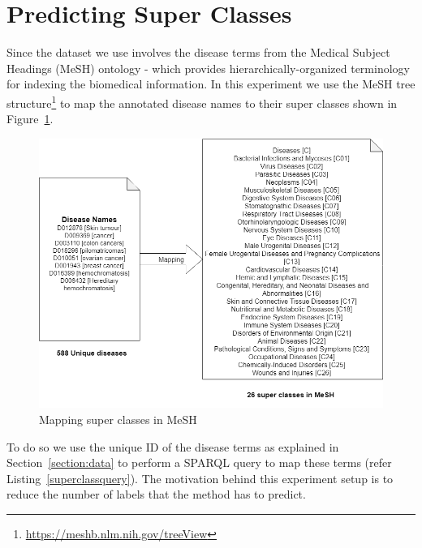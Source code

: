 \section{Predicting Super Classes}
Since the dataset we use involves the disease terms from the Medical Subject Headings (MeSH) ontology - which provides hierarchically-organized terminology for indexing the biomedical information. 
In this experiment we use the MeSH tree structure\footnote{\url{https://meshb.nlm.nih.gov/treeView}} to map the annotated disease names to their super classes shown in Figure~\ref{fig:meshsuperclass}. 
\begin{figure}[!htb]
    \centering
    \includegraphics[scale=0.45]{Figures/NN_prediction.png}
    \caption{Mapping super classes in MeSH}
    \label{fig:meshsuperclass}
\end{figure}
To do so we use the unique ID of the disease terms as explained in Section~\ref{section:data} to perform a SPARQL query to map these terms (refer Listing~\ref{superclassquery}). The motivation behind this experiment setup is to reduce the number of labels that the method has to predict. 

